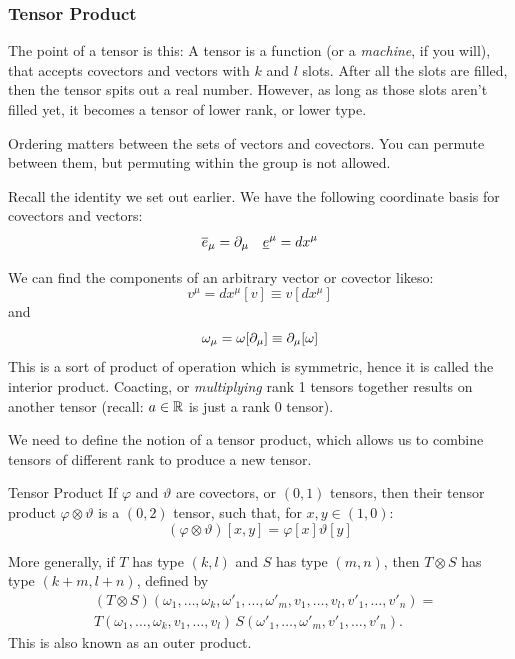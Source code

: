 \subsubsection{Tensor Product}
	\label{subsec:tensor product}
	The point of a tensor is this: A tensor is a function (or a \textit{machine}, if you will),
	that accepts covectors and vectors with $k$ and $l$ slots. After all the slots are filled,
	then the tensor spits out a real number. However, as long as those slots aren't filled yet,
	it becomes a tensor of lower rank, or lower type.

	Ordering matters between the sets of vectors and covectors. You
	can permute between them, but permuting within the group is not allowed. 

	Recall the identity we set out earlier. We have the following 
	coordinate basis for covectors and vectors:
	\begin{align*}
		\overline{e}_\mu = \partial_\mu && \underline{e}^\mu = dx^\mu
	\end{align*}

	We can find the components of an arbitrary vector or covector likeso:
	\[
		v^\mu = dx^\mu[v] \equiv v[dx^\mu]
	\]
	and
	\[
		\omega_\mu = \omega[\partial_\mu]\equiv \partial_\mu[\omega]
	\]
	This is a sort of product of operation which is symmetric, hence it is called the 
	interior product.
	Coacting, or \textit{multiplying} rank 1 tensors together
	results on another tensor (recall: $a\in\mathbb{R}$ is just a rank 0 tensor).

	We need to define the notion of a tensor product, which
	allows us to combine tensors of different rank to produce a 
	new tensor. 

	\begin{definition}{Tensor Product}
	    If $\varphi$ and $\vartheta$ are covectors, or $(0,1)$ tensors, then
		their tensor product $\varphi\otimes\vartheta$ is a $(0,2)$ tensor, such that, for $x,y\in(1,0)$:
		\begin{equation}
			\label{eq:tensor-product-defn}
			(\varphi\otimes\vartheta)[x,y] = \varphi[x]\vartheta[y]
		\end{equation}

		More generally, if $T$ has type $(k, l)$ and $S$ has type $(m, n)$,
		then $T \otimes S$ has type $(k + m, l + n)$, defined by
		\begin{align*}
			&(T \otimes S)(\omega_1, \ldots, \omega_k, \omega'_1, \ldots, \omega'_m,
			v_1, \ldots, v_l, v'_1, \ldots, v'_n)
			=\\ &T(\omega_1, \ldots, \omega_k, v_1, \ldots, v_l)
			  \,S(\omega'_1, \ldots, \omega'_m, v'_1, \ldots, v'_n).
		\end{align*}
		This is also known as an outer product.
	\end{definition}

